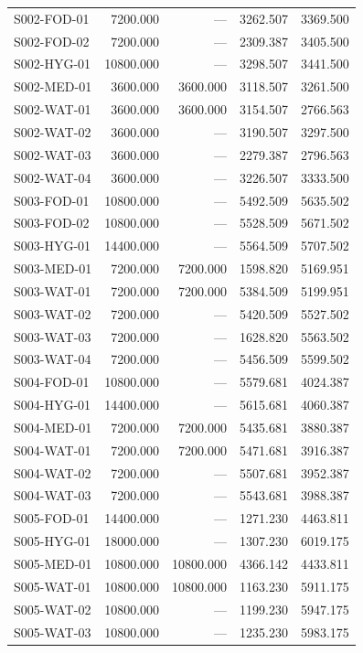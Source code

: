 \documentclass[a4paper]{my_paper}%
\numberwithin{equation}{section}
\theoremstyle{definition}
\begin{document}
\begin{longtable}{@{}lrrrr@{}}
S002-FOD-01 & 7200.000 & — & 3262.507 & 3369.500\\
S002-FOD-02 & 7200.000 & — & 2309.387 & 3405.500\\
S002-HYG-01 & 10800.000 & — & 3298.507 & 3441.500\\
S002-MED-01 & 3600.000 & 3600.000 & 3118.507 & 3261.500\\
S002-WAT-01 & 3600.000 & 3600.000 & 3154.507 & 2766.563\\
S002-WAT-02 & 3600.000 & — & 3190.507 & 3297.500\\
S002-WAT-03 & 3600.000 & — & 2279.387 & 2796.563\\
S002-WAT-04 & 3600.000 & — & 3226.507 & 3333.500\\
S003-FOD-01 & 10800.000 & — & 5492.509 & 5635.502\\
S003-FOD-02 & 10800.000 & — & 5528.509 & 5671.502\\
S003-HYG-01 & 14400.000 & — & 5564.509 & 5707.502\\
S003-MED-01 & 7200.000 & 7200.000 & 1598.820 & 5169.951\\
S003-WAT-01 & 7200.000 & 7200.000 & 5384.509 & 5199.951\\
S003-WAT-02 & 7200.000 & — & 5420.509 & 5527.502\\
S003-WAT-03 & 7200.000 & — & 1628.820 & 5563.502\\
S003-WAT-04 & 7200.000 & — & 5456.509 & 5599.502\\
S004-FOD-01 & 10800.000 & — & 5579.681 & 4024.387\\
S004-HYG-01 & 14400.000 & — & 5615.681 & 4060.387\\
S004-MED-01 & 7200.000 & 7200.000 & 5435.681 & 3880.387\\
S004-WAT-01 & 7200.000 & 7200.000 & 5471.681 & 3916.387\\
S004-WAT-02 & 7200.000 & — & 5507.681 & 3952.387\\
S004-WAT-03 & 7200.000 & — & 5543.681 & 3988.387\\
S005-FOD-01 & 14400.000 & — & 1271.230 & 4463.811\\
S005-HYG-01 & 18000.000 & — & 1307.230 & 6019.175\\
S005-MED-01 & 10800.000 & 10800.000 & 4366.142 & 4433.811\\
S005-WAT-01 & 10800.000 & 10800.000 & 1163.230 & 5911.175\\
S005-WAT-02 & 10800.000 & — & 1199.230 & 5947.175\\
S005-WAT-03 & 10800.000 & — & 1235.230 & 5983.175\\

\end{longtable}
\end{document}
